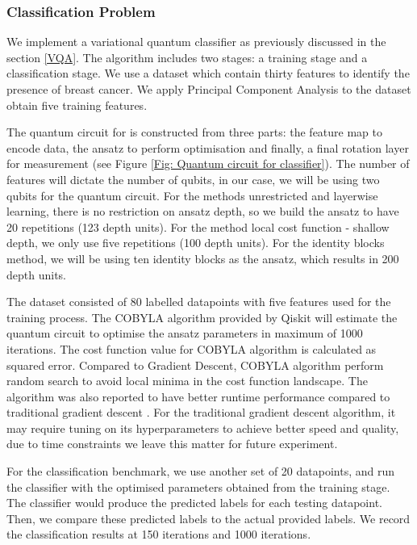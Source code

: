 \subsubsection{Classification Problem} \label{Sec: Classification Problem}
We implement a variational quantum classifier as previously discussed in the section \ref{VQA}.
The algorithm includes two stages: a training stage and a classification stage.
We use a dataset which contain thirty features to identify the presence of breast cancer.
We apply Principal Component Analysis to the dataset obtain five training features.

The quantum circuit for is constructed from three parts: the feature map to encode data, the ansatz to perform optimisation and finally, a final rotation layer for measurement (see Figure \ref{Fig: Quantum circuit for classifier}).
The number of features will dictate the number of qubits, in our case, we will be using two qubits for the quantum circuit.
For the methods unrestricted and layerwise learning, there is no restriction on ansatz depth, so we build the ansatz to have 20 repetitions (123 depth units).
For the method local cost function - shallow depth, we only use five repetitions (100 depth units).
For the identity blocks method, we will be using ten identity blocks as the ansatz, which results in 200 depth units.

The dataset consisted of 80 labelled datapoints with five features used for the training process.
The COBYLA algorithm provided by Qiskit will estimate the quantum circuit to optimise the ansatz parameters in maximum of 1000 iterations.
The cost function value for COBYLA algorithm is calculated as squared error.
Compared to Gradient Descent, COBYLA algorithm perform random search to avoid local minima in the cost function landscape.
The algorithm was also reported to have better runtime performance compared to traditional gradient descent \cite{huangEmpiricalStudyOptimizers2020, bonet-monroigPerformanceComparisonOptimization2021}.
For the traditional gradient descent algorithm, it may require tuning on its hyperparameters to achieve better speed and quality, due to time constraints we leave this matter for future experiment.

For the classification benchmark, we use another set of 20 datapoints, and run the classifier with the optimised parameters obtained from the training stage.
The classifier would produce the predicted labels for each testing datapoint.
Then, we compare these predicted labels to the actual provided labels.
We record the classification results at 150 iterations and 1000 iterations.



